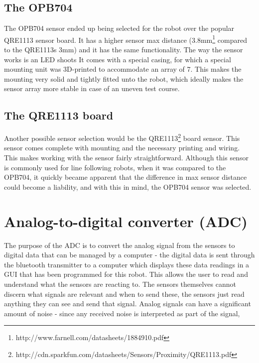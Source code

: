 \subsection{The OPB704}
The OPB704 sensor ended up being selected for the robot over the popular QRE1113 sensor board. It has a higher sensor max distance (3.8mm\footnote{http://www.farnell.com/datasheets/1884910.pdf} compared to the QRE1113s 3mm) and it has the same functionality. The way the sensor works is an LED shoots It comes with a special casing, for which a special mounting unit was 3D-printed to accommodate an array of 7. This makes the mounting very solid and tightly fitted unto the robot, which ideally makes the sensor array more stable in case of an uneven test course.

\subsection{The QRE1113 board}
Another possible sensor selection would be the QRE1113\footnote{http://cdn.sparkfun.com/datasheets/Sensors/Proximity/QRE1113.pdf} board sensor. This sensor comes complete with mounting and the necessary printing and wiring. This makes working with the sensor fairly straightforward. Although this sensor is commonly used for line following robots, when it was compared to the OPB704, it quickly became apparent that the difference in max sensor distance could become a liability, and with this in mind, the OPB704 sensor was selected.


\section{Analog-to-digital converter (ADC)}
The purpose of the ADC is to convert the analog signal from the sensors to digital data that can be managed by a computer - the digital data is sent through the bluetooth transmitter to a computer which displays these data readings in a GUI that has been programmed for this robot. This allows the user to read and understand what the sensors are reacting to. The sensors themselves cannot discern what signals are relevant and when to send these, the sensors just read anything they can see and send that signal. Analog signals can have a significant amount of noise - since any received noise is interpreted as part of the signal, 

